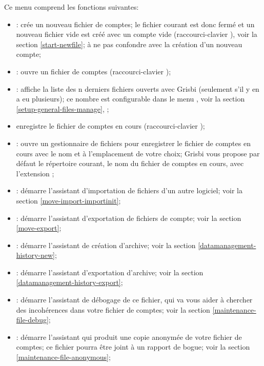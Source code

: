Ce menu comprend les fonctions suivantes:
\begin{itemize}
	\item {}: crée un nouveau fichier de comptes; le fichier courant est donc fermé et un nouveau fichier vide est créé avec un compte vide (raccourci-clavier ), voir la section \vref{start-newfile}; à ne pas confondre avec la création d'un nouveau compte;
	\item {}: ouvre un fichier de comptes (raccourci-clavier );
	\item {}: affiche la liste des n derniers fichiers ouverts avec Grisbi (seulement s'il y en a eu plusieurs); ce nombre est configurable dans le menu , voir la section \vref{setup-general-files-manage}, ;
	\item {} enregistre le fichier de comptes en cours (raccourci-clavier );
	\item {}: ouvre un gestionnaire de fichiers pour enregistrer le fichier de comptes en cours avec le nom et à l'emplacement de 	votre choix; Grisbi vous propose par défaut le répertoire courant, le nom du fichier de comptes en cours, avec l'extension ;
	\item {}: démarre l'assistant d'importation de fichiers d'un autre logiciel; voir la section \vref{move-import-importinit};
	\item {}: démarre l'assistant d'exportation de fichiers de compte; voir la section \vref{move-export};	
	\item {}: démarre l'assistant de création d'archive; voir la section \vref{datamanagement-history-new};	
	\item {}: démarre l'assistant d'exportation d'archive; voir la section \vref{datamanagement-history-export};
	\item {}: démarre l'assistant de 	débogage de ce fichier, qui va vous aider à chercher des incohérences dans votre fichier de comptes; voir la section \vref{maintenance-file-debug};
	\item {}: démarre l'assistant qui produit une copie anonymée de votre fichier de comptes; ce fichier pourra être joint à un rapport de bogue; voir la section \vref{maintenance-file-anonymous};	

\end{itemize}
